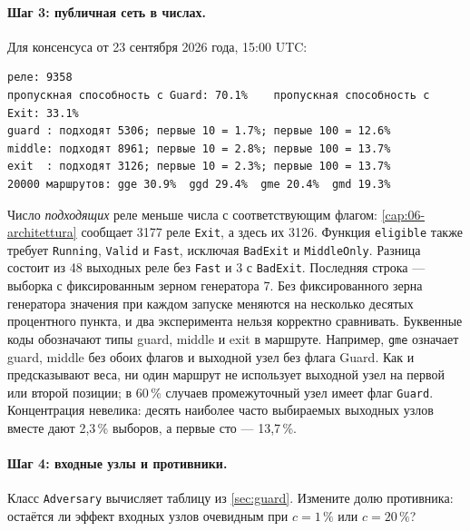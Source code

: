 \paragraph{Шаг 3: публичная сеть в числах.} Для консенсуса от 23 сентября 2026 года, 15:00 UTC:
\begin{lstlisting}[numbers=none]
реле: 9358
пропускная способность с Guard: 70.1%    пропускная способность с Exit: 33.1%
guard : подходят 5306; первые 10 = 1.7%; первые 100 = 12.6%
middle: подходят 8961; первые 10 = 2.8%; первые 100 = 13.7%
exit  : подходят 3126; первые 10 = 2.3%; первые 100 = 13.7%
20000 маршрутов: gge 30.9%  ggd 29.4%  gme 20.4%  gmd 19.3%
\end{lstlisting}
Число \emph{подходящих} реле меньше числа с соответствующим флагом: \cref{cap:06-architettura} сообщает 3177 реле \texttt{Exit}, а здесь их 3126. Функция \texttt{eligible} также требует \texttt{Running}, \texttt{Valid} и \texttt{Fast}, исключая \texttt{BadExit} и \texttt{MiddleOnly}. Разница состоит из 48 выходных реле без \texttt{Fast} и 3 с \texttt{BadExit}.
Последняя строка --- выборка с фиксированным зерном генератора 7. Без фиксированного зерна генератора значения при каждом запуске меняются на несколько десятых процентного пункта, и два эксперимента нельзя корректно сравнивать. Буквенные коды обозначают типы guard, middle и exit в маршруте. Например, \texttt{gme} означает guard, middle без обоих флагов и выходной узел без флага Guard. Как и предсказывают веса, ни один маршрут не использует выходной узел на первой или второй позиции; в 60\,\% случаев промежуточный узел имеет флаг \texttt{Guard}. Концентрация невелика: десять наиболее часто выбираемых выходных узлов вместе дают 2,3\,\% выборов, а первые сто --- 13,7\,\%.

\paragraph{Шаг 4: входные узлы и противники.} Класс \texttt{Adversary} вычисляет таблицу из \cref{sec:guard}. Измените долю противника: остаётся ли эффект входных узлов очевидным при $c = 1\,\%$ или $c = 20\,\%$?


